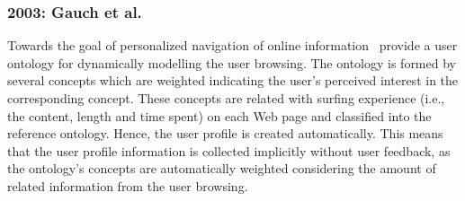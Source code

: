 
\subsubsection{2003: Gauch et al.}
\label{sec:gauch}

Towards the goal of personalized navigation of online information~\citet{gauch_ontology_based_2003}
provide a user ontology for dynamically modelling the user browsing. The ontology
is formed by several concepts which are weighted indicating the user's perceived
interest in the corresponding concept. These concepts are related with surfing
experience (i.e., the content, length and time spent) on each Web page and
classified into the reference ontology. Hence, the user profile is created 
automatically. This means that the user profile information is collected 
implicitly without user feedback, as the ontology's concepts are automatically 
weighted considering the amount of related information from the user browsing.


